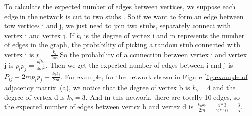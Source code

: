 \documentclass[12pt,oneside,final]{vlsithesis}
\begin{document}
\begin{figure*}
	\centering
	\caption{Example of adjacency matrix}
	\label{fig:example of adjacency matrix}
\end{figure*}

To calculate the expected number of edges between vertices, we suppose each edge in the network is cut to two stubs \cite{fortunato2010community}. So if we want to form an edge between tow vertices i and j, we just need to join two stubs, separately connect with vertex i and vertex j. If $k_{i}$ is the degree of vertex i and m represents the number of edges in the graph, the probability of picking a random stub connected with vertex i is $p_{i} = \frac{k_{i}}{2m}$.So the probability of a connection between vertex i and vertex j is $p_{i}p_{j} = \frac{k_{i}k_{j}}{4m^{2}}$. Then we get the expected number of edges between i and j is $ P_{ij} = 2mp_{i}p_{j} =  \frac{k_{i}k_{j}}{2m}$. For example, for the network shown in Figure \ref{fig:example of adjacency matrix} (a), we notice that the degree of vertex b is $k_{b} = 4$ and the degree of vertex d is $k_{b} = 3$. And in this network, there are totally 10 edges, so the expected number of edges between vertex b and vertex d is: $\frac{k_{b}k_{e}}{2m}=\frac{4 * 3}{2 * 10} = \frac{3}{5}$.
\end{document}
